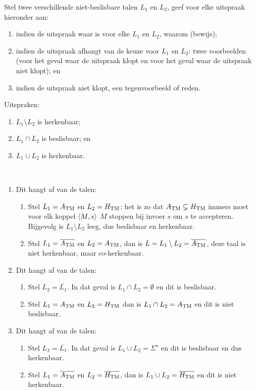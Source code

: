 \documentclass{article}
\begin{document}
\begin{question}
Stel twee verschillende niet-beslisbare talen $L_1$ en $L_2$, geef voor elke uitspraak hieronder aan:
\begin{enumerate}
 \item indien de uitspraak waar is voor elke $L_1$ en $L_2$, waarom (bewijs);
 \item indien de uitspraak afhangt van de keuze voor $L_1$ en $L_2$: twee voorbeelden (voor het geval waar de uitspraak klopt en voor het geval waar de uitspraak niet klopt); en
 \item indien de uitspraak niet klopt, een tegenvoorbeeld of reden.
\end{enumerate}
Uitspraken:
\begin{enumerate}
 \item $L_1\setminus L_2$ is herkenbaar;
 \item $L_1\cap L_2$ is beslisbaar; en
 \item $L_1\cup L_2$ is herkenbaar.
\end{enumerate}
\begin{answer}~~
\begin{enumerate}
 \item Dit hangt af van de talen:
 \begin{enumerate}
  \item Stel $L_1=A_{\rm TM}$ en $L_2=H_{\rm TM}$: het is zo dat $A_{\rm TM}\subsetneq H_{\rm TM}$ immers moet voor elk koppel $\left\langle M,s \right\rangle$ $M$ stoppen bij invoer $s$ om $s$ te accepteren. Bijgevolg is $L_1\setminus L_2$ leeg, dus beslisbaar en herkenbaar.
  \item Stel $L_1=\overline{A_{\rm TM}}$ en $L_2=A_{\rm TM}$, dan is $L=L_1\setminus L_2=\overline{A_{\rm TM}}$, deze taal is niet herkenbaar, maar co-herkenbaar.
 \end{enumerate}
 \item Dit hangt af van de talen:
  \begin{enumerate}
   \item Stel $L_2=\overline{L_1}$. In dat geval is $L_1\cap L_2=\emptyset$ en dit is beslisbaar.
   \item Stel $L_1=A_{\rm TM}$ en $L_2=H_{\rm TM}$ dan is $L_1\cap L_2=A_{\rm TM}$ en dit is niet beslisbaar.
  \end{enumerate}
 \item Dit hangt af van de talen:
  \begin{enumerate}
    \item Stel $L_2=\overline{L_1}$. In dat geval is $L_1\cup L_2=\Sigma^{\star}$ en dit is beslisbaar en dus herkenbaar.
    \item Stel $L_1=\overline{A_{\rm TM}}$ en $L_2=\overline{H_{\rm TM}}$, dan is $L_1\cup L_2=\overline{H_{\rm TM}}$ en dit is niet herkenbaar.
  \end{enumerate}
\end{enumerate}
\end{answer}
\end{question}
\end{document}
